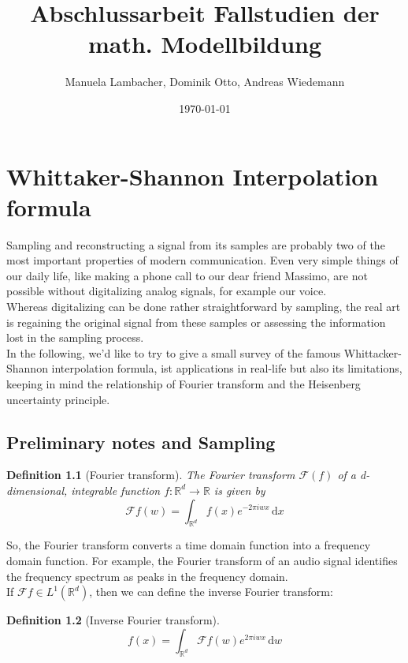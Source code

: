 \documentclass[a4paper, 11pt]{scrreprt}
\title{Abschlussarbeit Fallstudien der math. Modellbildung}
\author{Manuela Lambacher, Dominik Otto, Andreas Wiedemann}
\date{\today}
\newtheorem{defi}{Definition}[section]
\newcommand{\RR}{\mathbb{R}}
\newcommand{\FF}{\mathcal{F}}
\begin{document}
\parindent 0pt
\maketitle
\tableofcontents

\chapter{Whittaker-Shannon Interpolation formula}

Sampling and reconstructing a signal from its samples are probably two of the most important properties of modern communication.   Even very simple things of our daily life, like making a phone call to our dear friend Massimo, are not possible without digitalizing analog signals, for example  our voice. \\
Whereas digitalizing can be done rather  straightforward by sampling, the real art is regaining the original signal from these samples or assessing the information lost in the sampling process.\\
In the following, we'd like to try to give a small survey of the famous Whittacker-Shannon interpolation formula, ist applications in real-life but also its limitations, keeping in mind the relationship of Fourier transform and the Heisenberg uncertainty principle.


\section{Preliminary notes and Sampling}
\begin{defi}[Fourier transform]
The Fourier transform \(\FF(f)\) of a d-dimensional, integrable function \(f:\RR^d \to \RR\) is given by
	\begin{equation}
		\FF f(w)=\int_{\RR^d} f(x)e^{-2\pi iwx}\,\mathrm{d}x
	\end{equation}

\end{defi}
So, the Fourier transform converts a time domain function into a frequency domain function. For example, the Fourier transform of an audio signal identifies the frequency spectrum as peaks in the frequency domain.\\
If \(\FF f\in L^1(\RR^d)\), then we can define the inverse Fourier transform:
\begin{defi}[Inverse Fourier transform]
\begin{equation}
	f(x) = \int_{\RR^d} \FF f(w) e^{2\pi iwx}\,\mathrm{d}w
\end{equation}
\end{defi}
\end{document}
